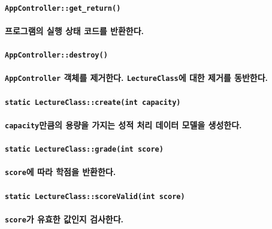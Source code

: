 \documentclass[UTF8]{report}
\begin{document}
            \paragraph{\texttt{AppController::get\_return()}}
            \paragraph{%
                \normalfont 프로그램의 실행 상태 코드를 반환한다.
            }
            
            \paragraph{\texttt{AppController::destroy()}}
            \paragraph{%
                \normalfont \texttt{AppController} 객체를 제거한다. \texttt{LectureClass}에 대한 제거를 동반한다.
            }

            \paragraph{\texttt{static LectureClass::create(int capacity)}}
            \paragraph{%
                \normalfont \texttt{capacity}만큼의 용량을 가지는 성적 처리 데이터 모델을 생성한다.
            }

            \paragraph{\texttt{static LectureClass::grade(int score)}}
            \paragraph{%
                \normalfont \texttt{score}에 따라 학점을 반환한다.
            }

            \paragraph{\texttt{static LectureClass::scoreValid(int score)}}
            \paragraph{%
                \normalfont \texttt{score}가 유효한 값인지 검사한다.
            }
\end{document}
